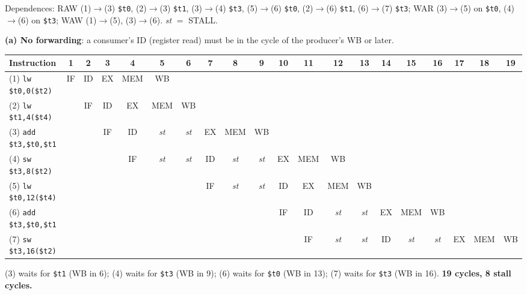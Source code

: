 \begin{solution}
Dependences: RAW (1)$\to$(3) \texttt{\$t0}, (2)$\to$(3) \texttt{\$t1},
(3)$\to$(4) \texttt{\$t3}, (5)$\to$(6) \texttt{\$t0}, (2)$\to$(6) \texttt{\$t1},
(6)$\to$(7) \texttt{\$t3}; WAR (3)$\to$(5) on \texttt{\$t0}, (4)$\to$(6) on
\texttt{\$t3}; WAW (1)$\to$(5), (3)$\to$(6). \textit{st} $=$ STALL.

\textbf{(a) No forwarding}: a consumer's ID (register read) must be in the cycle of
the producer's WB or later.
\begin{center}\scriptsize\setlength{\tabcolsep}{1.1pt}
\begin{tabular}{@{}lccccccccccccccccccc@{}}
\toprule
Instruction & 1 & 2 & 3 & 4 & 5 & 6 & 7 & 8 & 9 & 10 & 11 & 12 & 13 & 14 & 15 & 16 & 17 & 18 & 19 \\
\midrule
(1) \texttt{lw \$t0,0(\$t2)} & IF & ID & EX & MEM & WB &  &  &  &  &  &  &  &  &  &  &  &  &  &  \\
(2) \texttt{lw \$t1,4(\$t4)} &  & IF & ID & EX & MEM & WB &  &  &  &  &  &  &  &  &  &  &  &  &  \\
(3) \texttt{add \$t3,\$t0,\$t1} &  &  & IF & ID & \textit{st} & \textit{st} & EX & MEM & WB &  &  &  &  &  &  &  &  &  &  \\
(4) \texttt{sw \$t3,8(\$t2)} &  &  &  & IF & \textit{st} & \textit{st} & ID & \textit{st} & \textit{st} & EX & MEM & WB &  &  &  &  &  &  &  \\
(5) \texttt{lw \$t0,12(\$t4)} &  &  &  &  &  &  & IF & \textit{st} & \textit{st} & ID & EX & MEM & WB &  &  &  &  &  &  \\
(6) \texttt{add \$t3,\$t0,\$t1} &  &  &  &  &  &  &  &  &  & IF & ID & \textit{st} & \textit{st} & EX & MEM & WB &  &  &  \\
(7) \texttt{sw \$t3,16(\$t2)} &  &  &  &  &  &  &  &  &  &  & IF & \textit{st} & \textit{st} & ID & \textit{st} & \textit{st} & EX & MEM & WB \\
\bottomrule
\end{tabular}
\end{center}
(3) waits for \texttt{\$t1} (WB in 6); (4) waits for \texttt{\$t3} (WB in 9); (6)
waits for \texttt{\$t0} (WB in 13); (7) waits for \texttt{\$t3} (WB in 16).
\textbf{19 cycles, 8 stall cycles.}


\end{solution}
